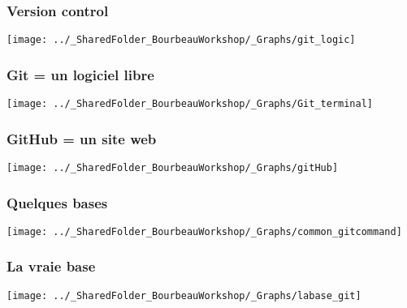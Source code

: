 \documentclass{beamer}
\begin{document}
	  \begin{frame}
	  
	        \frametitle{Version control} \vspace{1cm}   
	        \begin{center}
	           \texttt{[image: ../\_SharedFolder\_BourbeauWorkshop/\_Graphs/git\_logic]}
	        \end{center}  
	    \end{frame}
	    

	          \begin{frame}
	        \frametitle{Git = un logiciel libre} \vspace{1cm}   
	        \begin{center}
	           \texttt{[image: ../\_SharedFolder\_BourbeauWorkshop/\_Graphs/Git\_terminal]}
	        \end{center}  
	    \end{frame}
	    

	      \begin{frame}
	        \frametitle{GitHub = un site web} \vspace{1cm}   
	        \begin{center}
	           \texttt{[image: ../\_SharedFolder\_BourbeauWorkshop/\_Graphs/gitHub]}
	        \end{center}  
	    \end{frame}
	    

	      \begin{frame}
	        \frametitle{Quelques bases} \vspace{1cm}   
	        \begin{center}
	           \texttt{[image: ../\_SharedFolder\_BourbeauWorkshop/\_Graphs/common\_gitcommand]}
	        \end{center}  
	    \end{frame}
	    

	          \begin{frame}
	        \frametitle{La vraie base} \vspace{1cm}   
	        \begin{center}
	           \texttt{[image: ../\_SharedFolder\_BourbeauWorkshop/\_Graphs/labase\_git]}
	        \end{center}  
	    \end{frame}
	    
\end{document}
